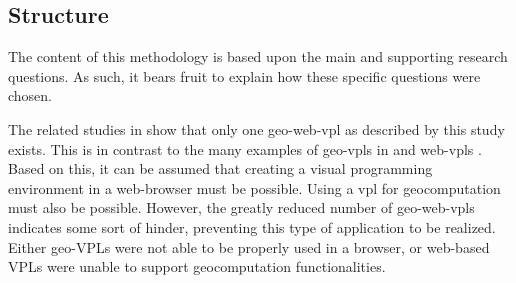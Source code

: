 







\subsection*{Structure}
  
The content of this methodology is based upon the main and supporting research questions. 
As such, it bears fruit to explain how these specific questions were chosen.

The related studies in  show that only one \ac{geo-web-vpl} as described by this study exists. This is in contrast to the many examples of geo-vpls in  and web-vpls . 
Based on this, it can be assumed that creating a visual programming environment in a web-browser must be possible. 
Using a \ac*{vpl} for geocomputation must also be possible. 
However, the greatly reduced number of geo-web-vpls indicates some sort of hinder, preventing this type of application to be realized. Either geo-VPLs were not able to be properly used in a browser, or web-based VPLs were unable to support geocomputation functionalities. 

